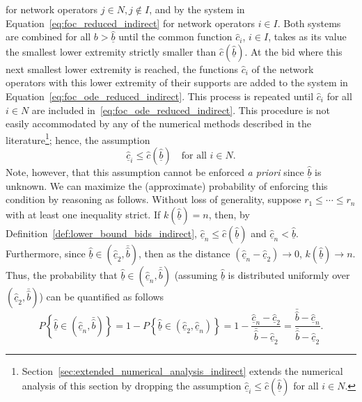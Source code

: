 for network operators $j\in N, j\not\in I$, and by the system in Equation~\eqref{eq:foc_reduced_indirect} for network operators $i\in I$. Both systems are combined for all $b > \underline{\hat{b}}$ until the common function $\hat{c}_i$, $i\in I$, takes as its value the smallest lower extremity strictly smaller than $\hat{c}(\underline{\hat{b}})$. At the bid where this next smallest lower extremity is reached, the functions $\hat{c}_i$ of the network operators with this lower extremity of their supports are added to the system in Equation~\eqref{eq:foc_ode_reduced_indirect}. This process is repeated until $\hat{c}_i$ for all $i\in N$ are included in~\eqref{eq:foc_ode_reduced_indirect}. This procedure is not easily accommodated by any of the numerical methods described in the literature\footnote{Section~\ref{sec:extended_numerical_analysis_indirect} extends the numerical analysis of this section by dropping the assumption $\underline{\hat{c}}_i \leq \hat{c}(\underline{\hat{b}})$ for all $i\in N$.}; hence, the assumption
\begin{equation*}
  \underline{\hat{c}}_i \leq \hat{c}(\underline{\hat{b}}) \quad\textrm{for all } i\in N.
\end{equation*}
Note, however, that this assumption cannot be enforced \emph{a priori} since $\underline{\hat{b}}$ is unknown. We can maximize the (approximate) probability of enforcing this condition by reasoning as follows. Without loss of generality, suppose $r_1\leq\cdots\leq r_n$ with at least one inequality strict. If $k(\underline{\hat{b}})=n$, then, by Definition~\ref{def:lower_bound_bids_indirect}, $\underline{\hat{c}}_n\leq \hat{c}(\underline{\hat{b}})$ and $\underline{\hat{c}}_n < \underline{\hat{b}}$. Furthermore, since $\underline{\hat{b}}\in (\underline{\hat{c}}_2, \bar{\hat{b}})$, then as the distance $(\underline{\hat{c}}_n-\underline{\hat{c}}_2)\to 0$, $k(\underline{\hat{b}})\to n$. Thus, the probability that $\underline{\hat{b}}\in (\underline{\hat{c}}_n, \bar{\hat{b}})$ (assuming $\underline{\hat{b}}$ is distributed uniformly over $(\underline{\hat{c}}_2, \bar{\hat{b}})$) can be quantified as follows
\begin{equation*}
  P\left\{ \underline{\hat{b}}\in (\underline{\hat{c}}_n, \bar{\hat{b}}) \right\} = 1 - P\left\{\underline{\hat{b}}\in(\underline{\hat{c}}_2, \underline{\hat{c}}_n)\right\} = 1 - \frac{\underline{\hat{c}}_n - \underline{\hat{c}}_2}{\bar{\hat{b}}-\underline{\hat{c}}_2} = \frac{\bar{\hat{b}} - \underline{\hat{c}}_n}{\bar{\hat{b}} - \underline{\hat{c}}_2}.
\end{equation*}
